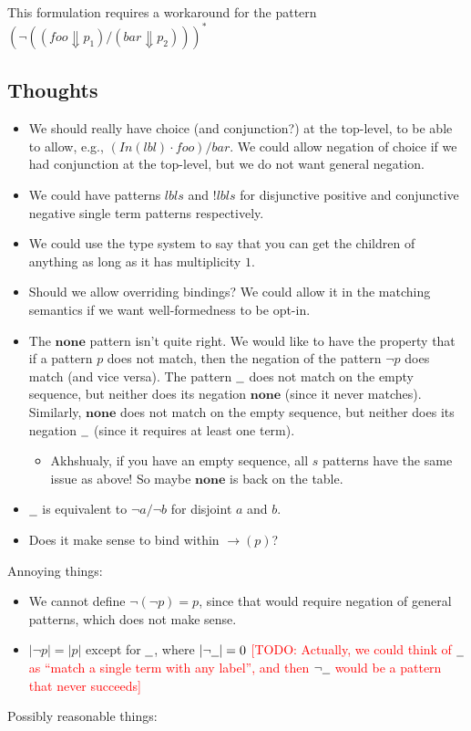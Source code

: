 \documentclass{article}
\newcommand{\RED}[1]{\textcolor{red}{#1}}
\newcommand{\TODO}[1]{\RED{[TODO: #1]}}
\newcommand{\lbl}{\ensuremath{\mathit{lbl}}}
\newcommand{\pseq}[2]{\ensuremath{#1 \cdot #2}}
\newcommand{\por}[2]{\ensuremath{#1/#2}}
\newcommand{\children}[2]{\ensuremath{#1} \Downarrow #2}
\newcommand{\pnot}[1]{\ensuremath{\lnot #1}}
\newcommand{\many}[1]{\ensuremath{#1^*}}
\newcommand{\any}{\ensuremath{\text{\underline{\hspace{0.6em}}}}}
\newcommand{\none}{\ensuremath{\mathbf{none}}}
\newcommand{\fb}[1]{\ensuremath{\mathop{\rightarrow}(#1)}}
\newcommand{\pin}[1]{\ensuremath{\mathit{In}(#1)}}
\begin{document}
This formulation requires a workaround for the pattern\\
$\many{(\pnot{(\por{(\children{\mathit{foo}}{p_1})}{(\children{\mathit{bar}}{p_2})})})}$
\subsection{Thoughts}

\begin{itemize}
\item We should really have choice (and conjunction?) at the
  top-level, to be able to allow, e.g.,
  $\por{(\pseq{\pin{\lbl}}{\mathit{foo}})}{bar}$. We could allow
  negation of choice if we had conjunction at the top-level, but
  we do not want general negation.
\item We could have patterns $\mathit{lbls}$ and $!\mathit{lbls}$
  for disjunctive positive and conjunctive negative single term
  patterns respectively.
\item We could use the type system to say that you can get the
  children of anything as long as it has multiplicity $1$.
\item Should we allow overriding bindings? We could allow it in
  the matching semantics if we want well-formedness to be opt-in.
\item The \none{} pattern isn't quite right. We would like to have
  the property that if a pattern $p$ does not match, then the
  negation of the pattern \pnot{p} does match (and vice versa).
  The pattern \any{} does not match on the empty sequence, but
  neither does its negation \none{} (since it never matches).
  Similarly, \none{} does not match on the empty sequence, but
  neither does its negation \any{} (since it requires at least one
  term).
  \begin{itemize}
  \item Akhshualy, if you have an empty sequence, all $s$ patterns
    have the same issue as above! So maybe \none{} is back on the
    table.
  \end{itemize}
\item \any{} is equivalent to \por{\pnot{a}}{\pnot{b}} for
  disjoint $a$ and $b$.
\item Does it make sense to bind within $\fb{p}$?
\end{itemize}
%
Annoying things:

\begin{itemize}
\item We cannot define $\lnot(\lnot p) = p$, since that would
  require negation of general patterns, which does not make sense.
\item $|\lnot p| = |p|$ except for $\any$, where $|\lnot\any| = 0$
  \TODO{Actually, we could think of \any{} as ``match a single
    term with any label'', and then \pnot{\any{}} would be a
    pattern that never succeeds}
\end{itemize}
%
Possibly reasonable things:
\end{document}

